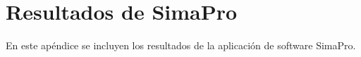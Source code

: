 \chapter{Resultados de SimaPro}\label{apend:simapro}
En este apéndice se incluyen los resultados de la aplicación de software SimaPro.
